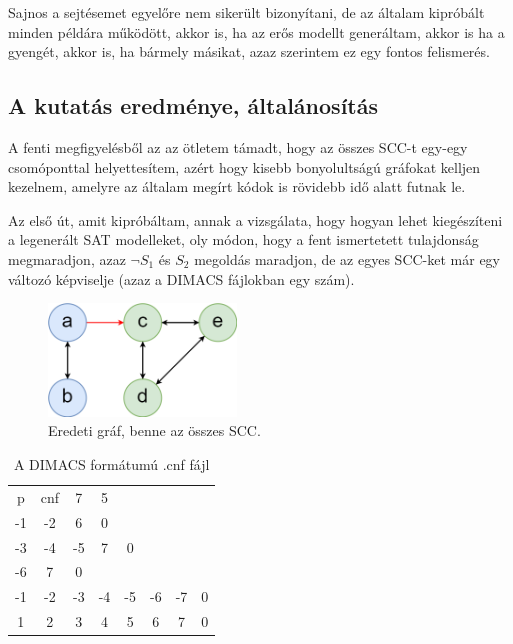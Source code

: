 \documentclass[
]{thesis-ekf}
\theoremstyle{definition}
\theoremstyle{remark}
\begin{document}
	Sajnos a sejtésemet egyelőre nem sikerült bizonyítani, de az általam kipróbált minden példára működött, akkor is, ha az erős modellt generáltam, akkor is ha a gyengét, akkor is, ha bármely másikat, azaz szerintem ez egy fontos felismerés.
	
		\subsection{A kutatás eredménye, általánosítás}

	A fenti megfigyelésből az az ötletem támadt, hogy az összes \textsc{SCC}-t egy-egy csomóponttal helyettesítem, azért hogy kisebb bonyolultságú gráfokat kelljen kezelnem, amelyre az általam megírt kódok is rövidebb idő alatt futnak le.

	Az első út, amit kipróbáltam, annak a vizsgálata, hogy hogyan lehet kiegészíteni a legenerált \textsc{SAT} modelleket, oly módon, hogy a fent ismertetett tulajdonság megmaradjon, azaz $\neg S_1$ és $ S_2 $ megoldás maradjon, de az egyes \textsc{SCC}-ket már egy változó képviselje (azaz a \textsc{DIMACS} fájlokban egy szám).
	\begin{figure}[!ht]
		\centering
		\includegraphics[width=5cm]{images/sajat_pelda_5node_9edge}
		\caption{Eredeti gráf, benne az összes \textsc{SCC}.}
		\label{abra-sajatpelda-eredeti-5-9graf}
	\end{figure}

	\begin{table}[!ht]
		\centering
		\begin{tabular}{cccccccc}
		p & cnf & 7 & 5 & & & &  \\
		-1&-2& 6& 0&  &  &  &  \\
		-3&-4&-5& 7& 0&  &  &  \\
		-6& 7& 0&  &  &  &  &  \\
		-1&-2&-3&-4&-5&-6&-7& 0 \\
		1& 2& 3& 4& 5& 6& 7& 0 \\
		\end{tabular}
		\caption{\label{table-esm-cnf}A \textsc{DIMACS} formátumú .cnf fájl}
	\end{table}
	
\end{document}
